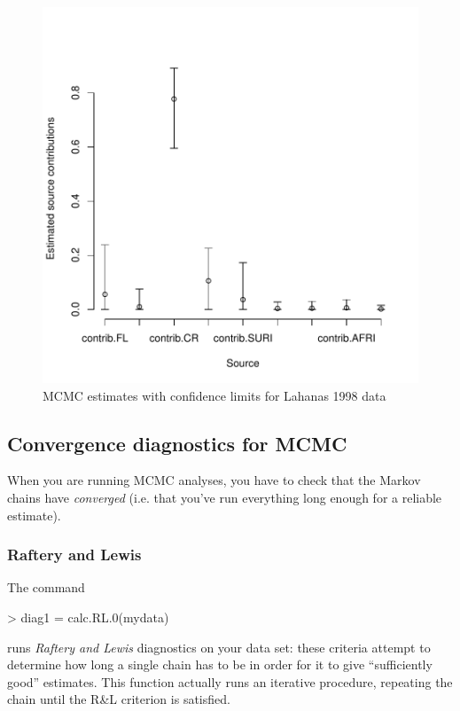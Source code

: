 \documentclass[11pt]{article}
\begin{document}
\begin{figure}
\includegraphics{mixstock-027}
\caption{MCMC estimates with confidence limits for Lahanas 1998 data}
\label{fig:mcmc1}
\end{figure}

\subsection{Convergence diagnostics for MCMC}

When you are running MCMC analyses, you have to check that
the Markov chains have \emph{converged} (i.e. that you've
run everything long enough for a reliable estimate).

\subsubsection{Raftery and Lewis}
The command
\begin{Schunk}
\begin{Sinput}
> diag1 = calc.RL.0(mydata)
\end{Sinput}
\end{Schunk}

runs \emph{Raftery and Lewis} diagnostics on your data
set: these criteria attempt to determine how long a single chain
has to be in order for it to give ``sufficiently good''
estimates.  This function actually runs an iterative
procedure, repeating the chain until the R\&L criterion
is satisfied.
\end{document}
